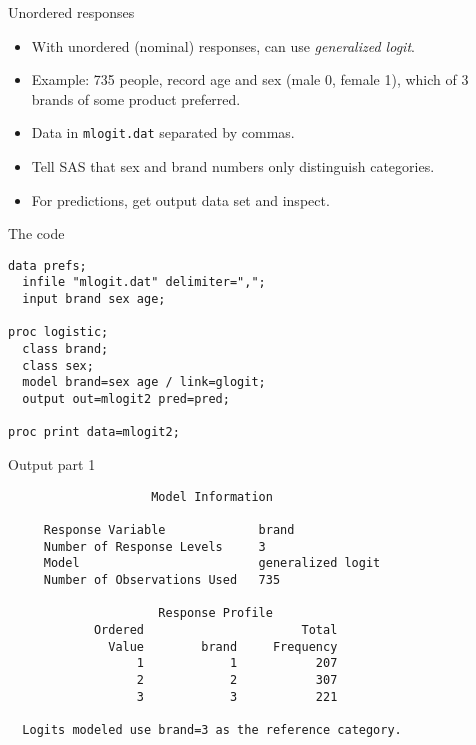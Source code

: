 \documentclass[pdf]{prosper}
\begin{document}

\begin{slide}{Unordered responses}

  \begin{itemize}
  \item With unordered (nominal) responses, can use {\em generalized logit}.
  \item Example: 735 people, record age and sex (male 0, female 1), which of 3 brands of some product preferred.
  \item Data in \verb-mlogit.dat- separated by commas.
  \item Tell SAS that sex and brand numbers only distinguish categories.
  \item For predictions, get output data set and inspect.
  \end{itemize}

\end{slide}

\begin{slide}{The code}

\begin{verbatim}
data prefs;
  infile "mlogit.dat" delimiter=",";
  input brand sex age;

proc logistic;
  class brand;
  class sex;
  model brand=sex age / link=glogit;
  output out=mlogit2 pred=pred;

proc print data=mlogit2;
\end{verbatim}

  
\end{slide}

\begin{slide}{Output part 1}

{\scriptsize
\begin{verbatim}
                    Model Information

     Response Variable             brand
     Number of Response Levels     3
     Model                         generalized logit
     Number of Observations Used   735

                     Response Profile
            Ordered                      Total
              Value        brand     Frequency
                  1            1           207
                  2            2           307
                  3            3           221

  Logits modeled use brand=3 as the reference category.
\end{verbatim}
}
  
\end{slide}
\end{document}
